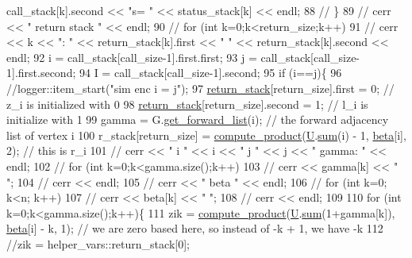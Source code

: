\begin{DoxyCode}
{       call\_stack[k].second << "s= " << status\_stack[k] << endl;}
88     \textcolor{comment}{// \}}
89     \textcolor{comment}{// cerr << " return stack " << endl;}
90     \textcolor{comment}{// for (int k=0;k<return\_size;k++)}
91     \textcolor{comment}{//   cerr << k << ": " << return\_stack[k].first << " " << return\_stack[k].second << endl;}
92     i = call\_stack[call\_size-1].first.first;
93     j = call\_stack[call\_size-1].first.second;
94     I = call\_stack[call\_size-1].second;
95     \textcolor{keywordflow}{if} (i==j)\{
96       \textcolor{comment}{//logger::item\_start("sim enc i = j");}
97       \hyperlink{namespacehelper__vars_a6d2100c373830cacd232319a9958652d}{return\_stack}[return\_size].first = 0; \textcolor{comment}{// z\_i is initialized with 0}
98       \hyperlink{namespacehelper__vars_a6d2100c373830cacd232319a9958652d}{return\_stack}[return\_size].second = 1; \textcolor{comment}{// l\_i is initialize with 1}
99       gamma = G.\hyperlink{classgraph_aa8fbee52a7b3604dbbd9175040c7ead5}{get\_forward\_list}(i); \textcolor{comment}{// the forward adjacency list of vertex i}
100       r\_stack[return\_size] = \hyperlink{compression__helper_8cpp_ae2afb43aabe50f7d42aae8f82b5a35f4}{compute\_product}(\hyperlink{classgraph__encoder_a3314c40920f2ee132958a6b0ce7e7995}{U}.\hyperlink{classreverse__fenwick__tree_a672731fd6395b4853430073a099a80e6}{sum}(i) - 1, 
      \hyperlink{classgraph__encoder_a40880adecfd63fb86e94b4b0fc3f6bc2}{beta}[i], 2); \textcolor{comment}{// this is r\_i}
101       \textcolor{comment}{// cerr << " i " << i << " j " << j << " gamma: " << endl;}
102       \textcolor{comment}{// for (int k=0;k<gamma.size();k++)}
103       \textcolor{comment}{//   cerr << gamma[k] << " ";}
104       \textcolor{comment}{// cerr << endl;}
105       \textcolor{comment}{// cerr << " beta " << endl;}
106       \textcolor{comment}{// for (int k=0; k<n; k++)}
107       \textcolor{comment}{//   cerr << beta[k] << " ";}
108       \textcolor{comment}{// cerr << endl;}
109 
110       \textcolor{keywordflow}{for} (\textcolor{keywordtype}{int} k=0;k<gamma.size();k++)\{
111         zik = \hyperlink{compression__helper_8cpp_ae2afb43aabe50f7d42aae8f82b5a35f4}{compute\_product}(\hyperlink{classgraph__encoder_a3314c40920f2ee132958a6b0ce7e7995}{U}.\hyperlink{classreverse__fenwick__tree_a672731fd6395b4853430073a099a80e6}{sum}(1+gamma[k]), \hyperlink{classgraph__encoder_a40880adecfd63fb86e94b4b0fc3f6bc2}{beta}[i] - k, 1); \textcolor{comment}{// we are zero
       based here, so instead of -k + 1, we have -k}
112         \textcolor{comment}{//zik = helper\_vars::return\_stack[0];}

\end{DoxyCode}
